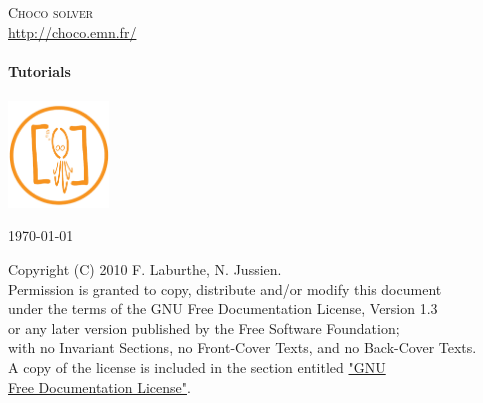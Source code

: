 \begin{titlepage}
\begin{center}
\textsc{\LARGE Choco solver}\\
\url{http://choco.emn.fr/}\\[1.5cm]

\HRule \\[0.4cm]
{ \Huge \bfseries Tutorials}\\
\HRule \\[1cm]
\includegraphics[width=0.20\textwidth]{media/logo.pdf} 

\vfill
{\large \today}
\end{center}
\end{titlepage}

\clearpage
{}
\begin{myquote}
Copyright (C)  2010  F. Laburthe, N. Jussien.\\
Permission is granted to copy, distribute and/or modify this document\\
under the terms of the GNU Free Documentation License, Version 1.3\\
or any later version published by the Free Software Foundation;\\
with no Invariant Sections, no Front-Cover Texts, and no Back-Cover Texts.\\
A copy of the license is included in the section entitled \hyperlink{licence}{"GNU \\Free Documentation License"}.
\end{myquote}
